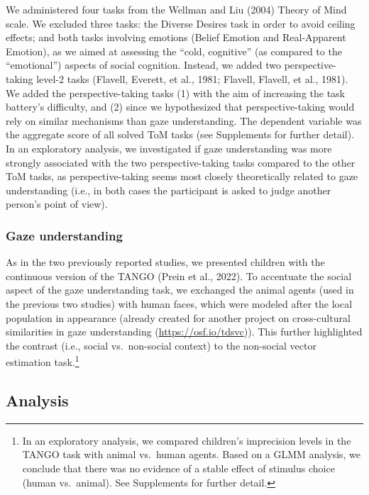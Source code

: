 \documentclass[
  man,floatsintext]{apa6}
\begin{document}
We administered four tasks from the Wellman and Liu (2004) Theory of Mind scale.
We excluded three tasks: the Diverse Desires task in order to avoid ceiling effects; and both tasks involving emotions (Belief Emotion and Real-Apparent Emotion), as we aimed at assessing the ``cold, cognitive'' (as compared to the ``emotional'') aspects of social cognition.
Instead, we added two perspective-taking level-2 tasks (Flavell, Everett, et al., 1981; Flavell, Flavell, et al., 1981).
We added the perspective-taking tasks (1) with the aim of increasing the task battery's difficulty, and (2) since we hypothesized that perspective-taking would rely on similar mechanisms than gaze understanding.
The dependent variable was the aggregate score of all solved ToM tasks (see Supplements for further detail).
In an exploratory analysis, we investigated if gaze understanding was more strongly associated with the two perspective-taking tasks compared to the other ToM tasks, as perspective-taking seems most closely theoretically related to gaze understanding (i.e., in both cases the participant is asked to judge another person's point of view).

\hypertarget{gaze-understanding}{%
\subsubsection{Gaze understanding}\label{gaze-understanding}}

As in the two previously reported studies, we presented children with the continuous version of the TANGO (Prein et al., 2022).
To accentuate the social aspect of the gaze understanding task, we exchanged the animal agents (used in the previous two studies) with human faces, which were modeled after the local population in appearance (already created for another project on cross-cultural similarities in gaze understanding (\url{https://osf.io/tdsvc})).
This further highlighted the contrast (i.e., social vs.~non-social context) to the non-social vector estimation task.\footnote{In an exploratory analysis, we compared children's imprecision levels in the TANGO task with animal vs.~human agents.
  Based on a GLMM analysis, we conclude that there was no evidence of a stable effect of stimulus choice (human vs.~animal).
  See Supplements for further detail.}

\hypertarget{analysis-2}{%
\subsection{Analysis}\label{analysis-2}}
\end{document}
